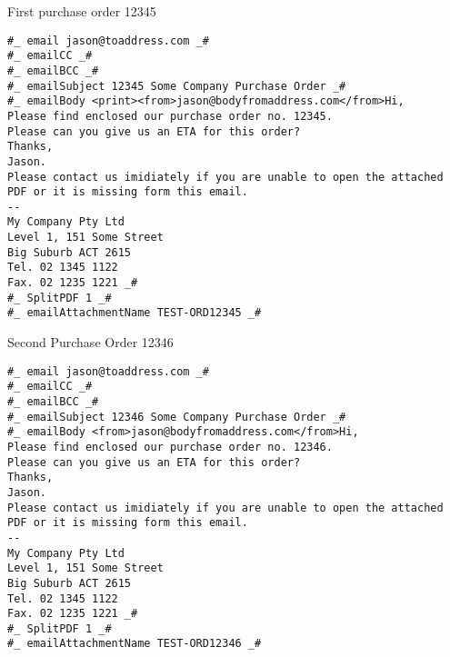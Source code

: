 \documentclass{article}
\begin{document}
\thispagestyle{empty}
First purchase order 12345
\newpage
\thispagestyle{empty}
\begin{verbatim}
#_ email jason@toaddress.com _#
#_ emailCC _#
#_ emailBCC _#
#_ emailSubject 12345 Some Company Purchase Order _#
#_ emailBody <print><from>jason@bodyfromaddress.com</from>Hi,
Please find enclosed our purchase order no. 12345.
Please can you give us an ETA for this order?
Thanks,
Jason.
Please contact us imidiately if you are unable to open the attached
PDF or it is missing form this email.
--
My Company Pty Ltd
Level 1, 151 Some Street
Big Suburb ACT 2615
Tel. 02 1345 1122
Fax. 02 1235 1221 _#
#_ SplitPDF 1 _#
#_ emailAttachmentName TEST-ORD12345 _#
\end{verbatim}
\newpage
\thispagestyle{empty}
Second Purchase Order 12346
\newpage
\thispagestyle{empty}
\begin{verbatim}
#_ email jason@toaddress.com _#
#_ emailCC _#
#_ emailBCC _#
#_ emailSubject 12346 Some Company Purchase Order _#
#_ emailBody <from>jason@bodyfromaddress.com</from>Hi,
Please find enclosed our purchase order no. 12346.
Please can you give us an ETA for this order?
Thanks,
Jason.
Please contact us imidiately if you are unable to open the attached
PDF or it is missing form this email.
--
My Company Pty Ltd
Level 1, 151 Some Street
Big Suburb ACT 2615
Tel. 02 1345 1122
Fax. 02 1235 1221 _#
#_ SplitPDF 1 _#
#_ emailAttachmentName TEST-ORD12346 _#
\end{verbatim}
\newpage
\end{document}
